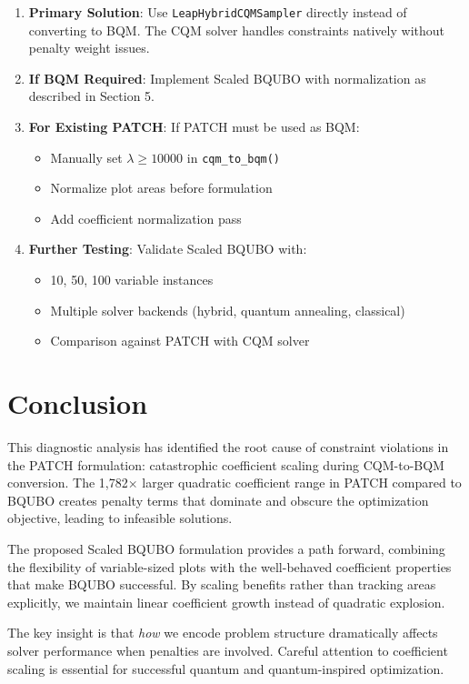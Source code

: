 \documentclass[11pt,a4paper]{article}
\begin{document}
\begin{enumerate}
    \item \textbf{Primary Solution}: Use \texttt{LeapHybridCQMSampler} directly instead of converting to BQM. The CQM solver handles constraints natively without penalty weight issues.
    
    \item \textbf{If BQM Required}: Implement Scaled BQUBO with normalization as described in Section 5.
    
    \item \textbf{For Existing PATCH}: If PATCH must be used as BQM:
    \begin{itemize}
        \item Manually set $\lambda \geq 10000$ in \texttt{cqm\_to\_bqm()}
        \item Normalize plot areas before formulation
        \item Add coefficient normalization pass
    \end{itemize}
    
    \item \textbf{Further Testing}: Validate Scaled BQUBO with:
    \begin{itemize}
        \item 10, 50, 100 variable instances
        \item Multiple solver backends (hybrid, quantum annealing, classical)
        \item Comparison against PATCH with CQM solver
    \end{itemize}
\end{enumerate}

\section{Conclusion}

This diagnostic analysis has identified the root cause of constraint violations in the PATCH formulation: catastrophic coefficient scaling during CQM-to-BQM conversion. The 1,782× larger quadratic coefficient range in PATCH compared to BQUBO creates penalty terms that dominate and obscure the optimization objective, leading to infeasible solutions.

The proposed Scaled BQUBO formulation provides a path forward, combining the flexibility of variable-sized plots with the well-behaved coefficient properties that make BQUBO successful. By scaling benefits rather than tracking areas explicitly, we maintain linear coefficient growth instead of quadratic explosion.

The key insight is that \textit{how} we encode problem structure dramatically affects solver performance when penalties are involved. Careful attention to coefficient scaling is essential for successful quantum and quantum-inspired optimization.
\end{document}
